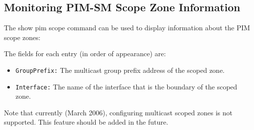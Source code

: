 \subsection{Monitoring PIM-SM Scope Zone Information}

The {\stt show pim scope} command can be used to display
information about the PIM scope zones:

\vspace{0.1in}
\noindent{}
\vspace{0.1in}

The fields for each entry (in order of appearance) are:
\begin{itemize}

  \item {\tt GroupPrefix:} The multicast group prefix address of the scoped
  zone.

  \item {\tt Interface:} The name of the interface that is the boundary
  of the scoped zone.

\end{itemize}

Note that currently (March 2006), configuring multicast scoped zones is not
supported. This feature should be added in the future.
